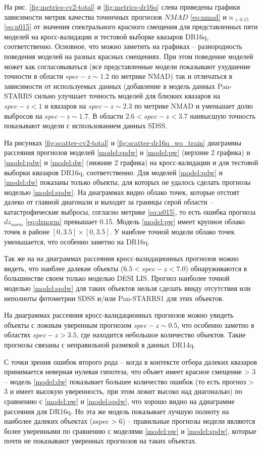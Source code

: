 \documentclass[fleqn,usenatbib]{mnras}
\begin{document}
На рис. \ref{fig:metrics-cv2-total} и \ref{fig:metrics-dr16q} слева приведены графики зависимости метрик качества точенчных прогнозов $NMAD$ \eqref{eq:nmad} и $n_{>0.15}$ \eqref{eq:n015} от значения спектрального красного смещения для представленных пяти моделей на кросс-валидации и тестовой выборке квазаров DR16q, соответственно. Основное, что можно заметить на графиках -- разнородность поведения моделей на разных красных смещениях. При этом поведение моделей может как согласовываться (все представленные модели показывают ухудшение точности в области $spec-z \sim 1.2$ по метрике NMAD) так и отличаться в зависимости от используемых данных (добавление в модель данных Pan-STARRS сильно улучшает точность моделей для близких квазаров на $spec-z < 1$ и квазаров на $spec-z \sim 2.3$ по метрике NMAD и уменьшает долю выбросов на $spec-z \sim 1.7$. В области $2.6 < spec-z < 3.7$ наивысшую точность показывают модели с использованием данных SDSS.

На рисунках \ref{fig:scatter-cv2-total} и \ref{fig:scatter-dr16q_wo_train} диаграммы рассеяния прогнозов моделей \ref{model:spdw} и \ref{model:pw} (верхние 2 графика) и \ref{model:pdw} и \ref{model:dw} (нижние 2 графика) на кросс-валидации и для тестовой выборки квазаров DR16q, соответственно. Для моделей \ref{model:pdw} и \ref{model:dw} показаны только объекты, для которых не удалось сделать прогнозы моделью \ref{model:spdw}. На диаграммах видно облако точек, которые отстоят далеко от главной диагонали и выходят за границы серой области -- катастрофические выбросы, согласно метрике \eqref{eq:n015}, то есть ошибка прогноза $dz_{norm}$ \eqref{eq:dznorm} превышает 0.15. Модель \ref{model:pw} имеет крупное облако точек в районе $[0, 3.5] \times [0, 3.5]$. У наиблее точной модели облако точек уменьшается, что особенно заметно на DR16q.

Так же на на диаграммах рассеяния кросс-валидационных прогнозов можно видеть, что наиблее далекие объекты ($6.5 < spec-z < 7.0$) обнаруживаются в большинстве своем только моделью DESI LIS. Прогноз наиболее точной моделью \ref{model:spdw} для таких объектов нельзя сделать ввиду отсутствия или неполноты фотометрии SDSS и/или Pan-STARRS1 для этих объектов.

На диаграммах рассеяния кросс-валидационных прогнозов можно увидеть объекты с ложным уверенным прогнозом $spec-z \sim 0.5$, что особенно заметно в областях $spec-z > 3.5$, где находится небольшое количество объектов. Такие прогнозы связаны с неправильной размекой в данных DR14q.

С точки зрения ошибок второго рода -- когда в контексте отбора далеких квазаров принимается неверная нулевая гипотеза, что объяет имеет красное смещение > 3 -- модель \ref{model:dw} показывает большее количество ошибок (то есть прогноз > 3 и имеет высокую уверенность, при этом лежит высоко над диагональю) по сравнению с \ref{model:pw} и \ref{model:spdw}, что хорошо видно на ддиаграмме рассеяния для DR16q. Но эта же модель показывает лучшую полноту на наиболее далеких объектах (zspec > 6) -- правильные прогнозы модели являются более уверенными по сравнению с моделями \ref{model:pw} и \ref{model:spdw}, которые почти не показывают уверенных прогнозов на таких объектах.
\end{document}
